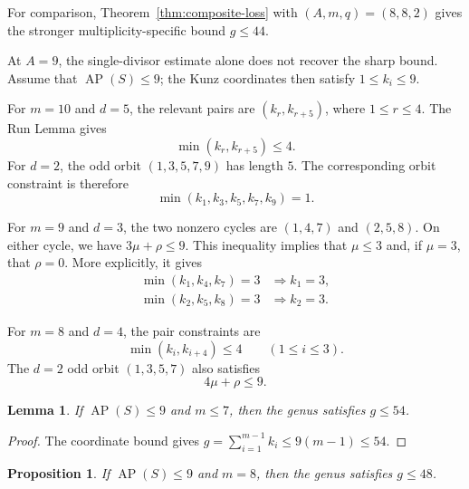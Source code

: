 \documentclass[11pt]{article}
\theoremstyle{plain}
\newtheorem{proposition}[theorem]{Proposition}
\newtheorem{lemma}[theorem]{Lemma}
\theoremstyle{definition}
\theoremstyle{remark}
\newcommand{\AP}{\operatorname{AP}}
\begin{document}
For comparison, Theorem~\ref{thm:composite-loss} with $(A,m,q)=(8,8,2)$
gives the stronger multiplicity-specific bound $g\leq44$.

At $A=9$, the single-divisor estimate alone does not recover the sharp bound.
Assume that $\AP(S)\leq9$; the Kunz coordinates then satisfy
$1\leq k_i\leq9$.

For $m=10$ and $d=5$, the relevant pairs are
$(k_r,k_{r+5})$, where $1\leq r\leq4$.  The Run Lemma gives
\begin{equation}\label{eq:m10-pairs}
  \min(k_r,k_{r+5})\leq4.
\end{equation}
For $d=2$, the odd orbit $(1,3,5,7,9)$ has length $5$.  The corresponding
orbit constraint is therefore
\begin{equation}\label{eq:m10-odd}
  \min(k_1,k_3,k_5,k_7,k_9)=1.
\end{equation}

For $m=9$ and $d=3$, the two nonzero cycles are $(1,4,7)$ and $(2,5,8)$.
On either cycle, we have $3\mu+\rho\leq9$.  This inequality implies that
$\mu\leq3$ and, if $\mu=3$, that $\rho=0$.  More explicitly, it gives
\begin{equation}\label{eq:m9-anchor}
  \begin{split}
  \min(k_1,k_4,k_7)=3&\Longrightarrow k_1=3,\\
  \min(k_2,k_5,k_8)=3&\Longrightarrow k_2=3.
  \end{split}
\end{equation}

For $m=8$ and $d=4$, the pair constraints are
\begin{equation}\label{eq:m8-pairs}
  \min(k_i,k_{i+4})\leq4\qquad(1\leq i\leq3).
\end{equation}
The $d=2$ odd orbit $(1,3,5,7)$ also satisfies
\begin{equation}\label{eq:m8-odd}
  4\mu+\rho\leq9.
\end{equation}

\begin{lemma}\label{lem:small-multiplicity}
If $\AP(S)\leq9$ and $m\leq7$, then the genus satisfies $g\leq54$.
\end{lemma}

\begin{proof}
The coordinate bound gives
$g=\sum_{i=1}^{m-1}k_i\leq9(m-1)\leq54$.
\end{proof}

\begin{proposition}\label{prop:m8-hand}
If $\AP(S)\leq9$ and $m=8$, then the genus satisfies $g\leq48$.
\end{proposition}
\end{document}
